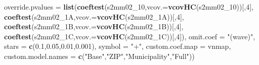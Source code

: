 \documentclass[
]{article}
\newenvironment{Shaded}{\begin{snugshade}}{\end{snugshade}}
\newcommand{\DataTypeTok}[1]{\textcolor[rgb]{0.13,0.29,0.53}{#1}}
\newcommand{\DecValTok}[1]{\textcolor[rgb]{0.00,0.00,0.81}{#1}}
\newcommand{\FloatTok}[1]{\textcolor[rgb]{0.00,0.00,0.81}{#1}}
\newcommand{\KeywordTok}[1]{\textcolor[rgb]{0.13,0.29,0.53}{\textbf{#1}}}
\newcommand{\NormalTok}[1]{#1}
\newcommand{\StringTok}[1]{\textcolor[rgb]{0.31,0.60,0.02}{#1}}
\begin{document}
\begin{Shaded}
\begin{Highlighting}[]
          \DataTypeTok{override.pvalues =} \KeywordTok{list}\NormalTok{(}\KeywordTok{coeftest}\NormalTok{(s2mm02_}\DecValTok{10}\NormalTok{,}\DataTypeTok{vcov.=}\KeywordTok{vcovHC}\NormalTok{(s2mm02_}\DecValTok{10}\NormalTok{))[,}\DecValTok{4}\NormalTok{],}
                                  \KeywordTok{coeftest}\NormalTok{(s2mm02_1A,}\DataTypeTok{vcov.=}\KeywordTok{vcovHC}\NormalTok{(s2mm02_1A))[,}\DecValTok{4}\NormalTok{],}
                                  \KeywordTok{coeftest}\NormalTok{(s2mm02_1B,}\DataTypeTok{vcov.=}\KeywordTok{vcovHC}\NormalTok{(s2mm02_1B))[,}\DecValTok{4}\NormalTok{],}
                                  \KeywordTok{coeftest}\NormalTok{(s2mm02_1C,}\DataTypeTok{vcov.=}\KeywordTok{vcovHC}\NormalTok{(s2mm02_1C))[,}\DecValTok{4}\NormalTok{]),}
          \DataTypeTok{omit.coef =} \StringTok{"(wave)"}\NormalTok{, }\DataTypeTok{stars =} \KeywordTok{c}\NormalTok{(}\FloatTok{0.1}\NormalTok{,}\FloatTok{0.05}\NormalTok{,}\FloatTok{0.01}\NormalTok{,}\FloatTok{0.001}\NormalTok{), }\DataTypeTok{symbol =} \StringTok{"+"}\NormalTok{,}
          \DataTypeTok{custom.coef.map =}\NormalTok{ vnmap, }
          \DataTypeTok{custom.model.names =} \KeywordTok{c}\NormalTok{(}\StringTok{"Base"}\NormalTok{,}\StringTok{"ZIP"}\NormalTok{,}\StringTok{"Municipality"}\NormalTok{,}\StringTok{"Full"}\NormalTok{))}
\end{Highlighting}
\end{Shaded}
\end{document}
